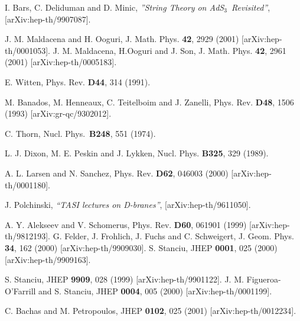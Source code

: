 \documentclass[a4paper,12pt]{article}
\begin{document}
\begin{thebibliography}{99}
  I. Bars, C. Deliduman and D. Minic, \textit{''String Theory
on AdS}$_{3}$\textit{\ Revisited''}, [arXiv:hep-th/9907087].

  J. M. Maldacena and H. Ooguri,
J. Math. Phys. \textbf{42}, 2929 (2001) [arXiv:hep-th/0001053].\newline
J. M. Maldacena, H.Ooguri and J. Son,
J. Math. Phys. \textbf{42}, 2961 (2001) [arXiv:hep-th/0005183].

  E. Witten, Phys. Rev. \textbf{D44}, 314 (1991).

  M. Banados, M. Henneaux, C. Teitelboim and J. Zanelli,
Phys. Rev. \textbf{D48}, 1506 (1993) [arXiv:gr-qc/9302012].

  C. Thorn, Nucl. Phys.\ \textbf{B248}, 551 (1974).

  L. J. Dixon, M. E. Peskin and J. Lykken, Nucl. Phys.
\textbf{B325}, 329 (1989).

  A. L. Larsen and N. Sanchez,
Phys. Rev. \textbf{D62}, 046003 (2000) [arXiv:hep-th/0001180].

  J. Polchinski, \textit{``TASI lectures on D-branes''},
[arXiv:hep-th/9611050].

  A. Y. Alekseev and V. Schomerus,
Phys. Rev. \textbf{D60}, 061901 (1999) [arXiv:hep-th/9812193]. \newline
G. Felder, J. Frohlich, J. Fuchs and C. Schweigert,
J. Geom. Phys. \textbf{34}, 162 (2000) [arXiv:hep-th/9909030]. \newline
S. Stanciu, %
JHEP \textbf{0001}, 025 (2000) [arXiv:hep-th/9909163].

  S. Stanciu,
JHEP \textbf{9909}, 028 (1999) [arXiv:hep-th/9901122].\newline
J. M. Figueroa-O'Farrill and S. Stanciu,
JHEP \textbf{0004}, 005 (2000) [arXiv:hep-th/0001199].

  C. Bachas and M. Petropoulos,
JHEP \textbf{0102}, 025 (2001) [arXiv:hep-th/0012234].


\end{thebibliography}
\end{document}
